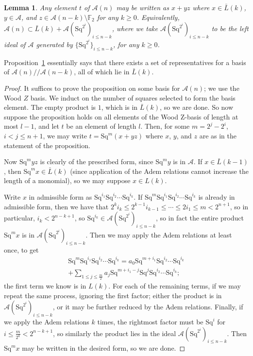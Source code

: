\documentclass{article}
\newcommand{\A}{\mathcal{A}}
\newcommand{\F}{\mathbb{F}}
\newcommand{\Sq}{\mathrm{Sq}}
\newcommand{\mmod}{/\!/\!}
\renewcommand{\L}{\bar{L}}
\newtheorem{lem}{Lemma}
\begin{document}
\begin{lem}\label{lem:set-of-reps}
  Any element $t$ of $\A(n)$ may be written as $x + yz$ where $x\in \L(k)$, $y\in \A$, and $z\in\A(n-k)\setminus \F_2$ for any $k\geq 0$.  Equivalently, $\A(n)\subset \L(k) + \A(\Sq^{2^i})_{i\leq n-k}$, where we take $\A(\Sq^{2^i})_{i\leq n-k}$ to be the left ideal of $\A$ generated by $\{\Sq^{2^i}\}_{i\leq n-k}$, for any $k\geq 0$.
\end{lem}

Proposition~\ref{lem:set-of-reps} essentially says that there exists a set of representatives for a basis of $\A(n)\mmod\A(n-k)$, all of which lie in $\L(k)$.

\begin{proof}
  It suffices to prove the proposition on some basis for $\A(n)$; we use the Wood $Z$ basis.  We induct on the number of squares selected to form the basis element.  The empty product is $1$, which is in $\L(k)$, so we are done.  So now suppose the proposition holds on all elements of the Wood Z-basis of length at most $l-1$, and let $t$ be an element of length $l$.  Then, for some $m=2^j-2^i$, $i<j\leq n+1$, we may write $t=\Sq^m\left(x+yz\right)$ where $x$, $y$, and $z$ are as in the statement of the proposition.

  Now $\Sq^myz$ is clearly of the prescribed form, since $\Sq^my$ is in $\A$.  If $x\in\L(k-1)$, then $\Sq^m x\in \L(k)$ (since application of the Adem relations cannot increase the length of a monomial), so we may suppose $x\in L(k)$.

  Write $x$ in admissible form as $\Sq^{i_1}\Sq^{i_2}\cdots\Sq^{i_k}$.  If $\Sq^m\Sq^{i_1}\Sq^{i_2}\cdots\Sq^{i_k}$ is already in admissible form, then we have that $2^ki_k\leq 2^{k-1}i_{k-1}\leq\cdots\leq2i_1\leq m<2^{n+1}$, so in particular, $i_k<2^{n-k+1}$, so $\Sq^{i_k}\in\A(\Sq^{2^i})_{i\leq n-k}$, so in fact the entire product $\Sq^mx$ is in $\A(\Sq^{2^i})_{i\leq n-k}$.  Then we may apply the Adem relations at least once, to get
  \begin{multline*}
  \Sq^m\Sq^{i_1}\Sq^{i_2}\cdots\Sq^{i_k} = a_0\Sq^{m+i_1}\Sq^{i_2}\cdots\Sq^{i_k} \\
                  + \sum_{1\leq j\leq \frac{m}2}a_j\Sq^{m+i_1-j}\Sq^j\Sq^{i_2}\cdots\Sq^{i_k};
  \end{multline*}
  the first term we know is in $L(k)$.  For each of the remaining terms, if we may repeat the same process, ignoring the first factor; either the product is in $\A(\Sq^{2^i})_{i\leq n-k}$, or it may be further reduced by the Adem relations.  Finally, if we apply the Adem relations $k$ times, the rightmost factor must be $\Sq^i$ for $i\leq \frac{m}{2^k}<2^{n-k+1}$, so similarly the product lies in the ideal $\A(\Sq^{2^i})_{i\leq n-k}$.  Then $\Sq^mx$ may be written in the desired form, so we are done.
\end{proof}
\end{document}

